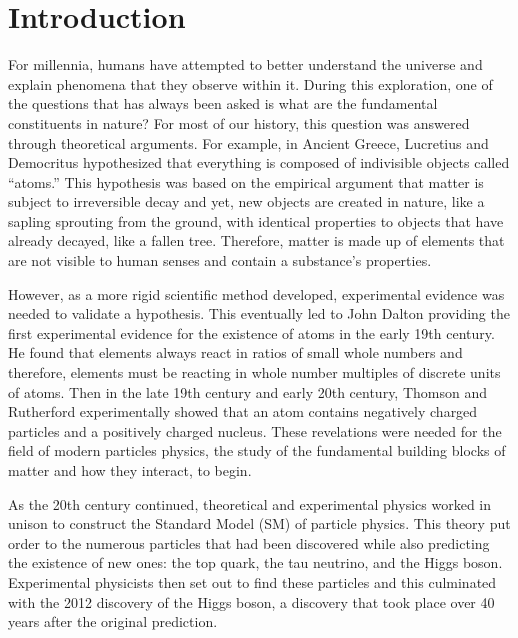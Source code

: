 \chapter{Introduction}
\label{ch:Intro}

For millennia, humans have attempted to better understand the universe and explain phenomena that they observe within it. During this exploration, one of the questions that has always been asked is what are the fundamental constituents in nature? For most of our history, this question was answered through theoretical arguments. For example, in Ancient Greece, Lucretius and Democritus hypothesized that everything is composed of indivisible objects called “atoms.” This hypothesis was based on the empirical argument that matter is subject to irreversible decay and yet, new objects are created in nature, like a sapling sprouting from the ground, with identical properties to objects that have already decayed, like a fallen tree. Therefore, matter is made up of elements that are not visible to human senses and contain a substance’s properties. 

However, as a more rigid scientific method developed, experimental evidence was needed to validate a hypothesis. This eventually led to John Dalton providing the first experimental evidence for the existence of atoms in the early 19th century. He found that elements always react in ratios of small whole numbers and therefore, elements must be reacting in whole number multiples of discrete units of atoms. Then in the late 19th century and early 20th century, Thomson and Rutherford experimentally showed that an atom contains negatively charged particles and a positively charged nucleus. These revelations were needed for the field of modern particles physics, the study of the fundamental building blocks of matter and how they interact, to begin. 

As the 20th century continued, theoretical and experimental physics worked in unison to construct the Standard Model (SM) of particle physics. This theory put order to the numerous particles that had been discovered while also predicting the existence of new ones: the top quark, the tau neutrino, and the Higgs boson. Experimental physicists then set out to find these particles and this culminated with the 2012 discovery of the Higgs boson, a discovery that took place over 40 years after the original prediction. 

